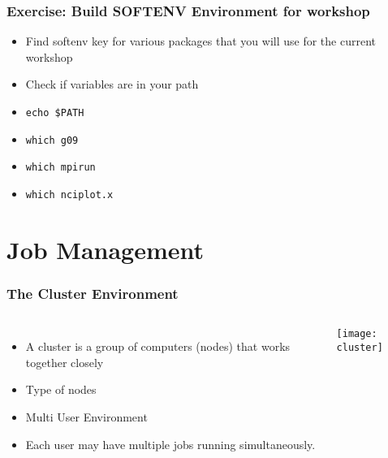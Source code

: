 \documentclass[slidestop,mathserif,compress,xcolor=svgnames,table]{beamer}
\begin{document}
\begin{frame}
\frametitle{\small Exercise: Build SOFTENV Environment for workshop}
\begin{itemize}
\item Find softenv key for various packages that you will use for the current workshop
\item Check if variables are in your path
\item[]\texttt{echo \$PATH}
\item[]\texttt{which g09}
\item[]\texttt{which mpirun}
\item[]\texttt{which nciplot.x}
\end{itemize}
\end{frame}


\section{Job Management}
\begin{frame}
\frametitle{\small The Cluster Environment}
\begin{columns}
\column{4cm}
\begin{itemize}
\item A cluster is a group of computers (nodes) that works together closely
\item Type of nodes
\item Multi User Environment
\item Each user may have multiple jobs running simultaneously.
\end{itemize}
\column{7cm}
\begin{center}
\texttt{[image: cluster]}
\end{center}
\end{columns}
\end{frame}
\end{document}

